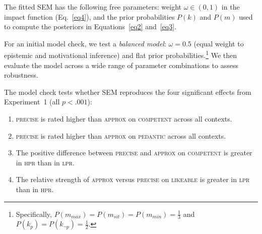 \documentclass[12pt,a4paper]{article}
\newcommand{\xvar}[1]{\textsc{#1}}
\begin{document}
The fitted SEM has the following free parameters: weight $\omega \in (0,1)$ in
the impact function (Eq.~\ref{eq4}), and the prior probabilities $P(k)$ and
$P(m)$ used to compute the posteriors in Equations~\ref{eq2} and~\ref{eq3}.

For an initial model check, we test a \emph{balanced model}: $\omega = 0.5$
(equal weight to epistemic and motivational inference) and flat prior
probabilities.\footnote{Specifically, $P(m_{max}) = P(m_{sit}) = P(m_{min}) =
\frac{1}{3}$ and $P(k_p) = P(k_{\neg p}) = \frac{1}{2}$.} We then evaluate
the model across a wide range of parameter combinations to assess robustness.

The model check tests whether SEM reproduces the four significant effects from
Experiment~1 (all $p < .001$):

\begin{enumerate}
\item \xvar{precise} is rated higher than \xvar{approx} on \xvar{competent}
across all contexts.

\item \xvar{precise} is rated higher than \xvar{approx} on \xvar{pedantic}
across all contexts.

\item The positive difference between \xvar{precise} and \xvar{approx} on
\xvar{competent} is greater in \xvar{hpr} than in \xvar{lpr}.

\item The relative strength of \xvar{approx} versus \xvar{precise} on
\xvar{likeable} is greater in \xvar{lpr} than in \xvar{hpr}.
\end{enumerate}
\end{document}
